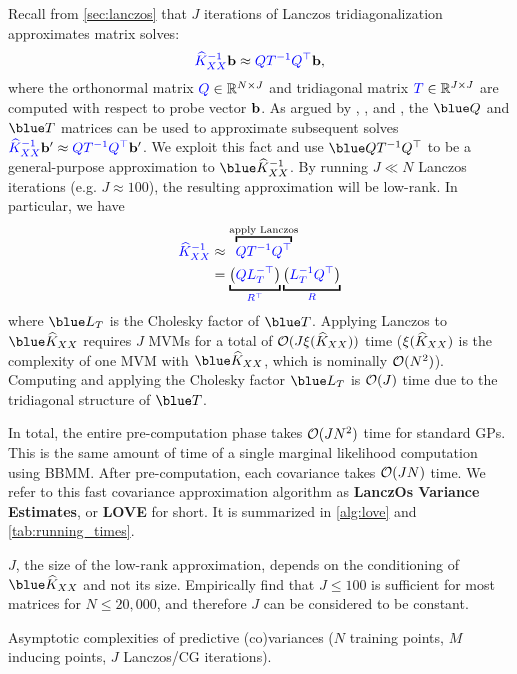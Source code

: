 Recall from \cref{sec:lanczos} that $J$ iterations of Lanczos tridiagonalization approximates matrix solves:
\[
  {\color{blue} \widehat{K}_{XX}^{-1}} \mathbf{b} \approx {\color{blue} \ensuremath{Q}\ensuremath{T}^{-1} \ensuremath{Q}^{\top}} \mathbf{b},
\]
where the orthonormal matrix ${\color{blue} Q} \in \mathbb{R}^{N \times J}$ and tridiagonal matrix ${\color{blue} T} \in \mathbb{R}^{J \times J}$ are computed with respect to probe vector $\mathbf{b}$.
As argued by \citet{parlett1980new}, \citet{saad1987lanczos}, and \citet{schneider2001krylov}, the $\blue \bQ$ and $\blue \bT$ matrices can be used to approximate subsequent solves
${\color{blue} \widehat{K}_{XX}^{-1}} \mathbf{b}' \approx {\color{blue} \ensuremath{Q}\ensuremath{T}^{-1} \ensuremath{Q}^\top} \mathbf{b}'$.
We exploit this fact and use $\blue \bQ \bT^{-1} \bQ^\top$ to be a general-purpose approximation to $\blue \trainK^{-1}$.
By running $J \ll N$ Lanczos iterations (e.g. $J \approx 100$), the resulting approximation will be low-rank.
In particular, we have
\begin{align*}
  {\color{blue} \trainK^{-1}} &\approx \overbracket{\color{blue} \bQ \bT^{-1} \bQ^\top}^{\text{apply Lanczos}}
  \\
  &=
  \underbracket{ \left( {\color{blue} \bQ \bL_\bT^{-\top}} \right)}_{\color{blue} \bR^\top}
  \underbracket{ \left( {\color{blue} \bL_\bT^{-1} \bQ^\top} \right)}_{\color{blue} \bR}
\end{align*}
%
where $\blue \bL_\bT$ is the Cholesky factor of $\blue \bT$.
Applying Lanczos to $\blue \trainK$ requires $J$ MVMs for a total of $\bigo{J \mvm{\trainK}}$ time ($\xi ( \widehat{K}_{XX} )$ is the complexity of one MVM with $\blue \trainK$, which is nominally $\bigo{N^2}$).
Computing and applying the Cholesky factor $\blue \bL_\bT$ is $\bigo{J}$ time due to the tridiagonal structure of $\blue \bT$.

In total, the entire pre-computation phase takes $\bigo{J N^2}$ time for standard GPs.
This is the same amount of time of a single marginal likelihood computation using BBMM.
After pre-computation, each covariance takes $\bigo{JN}$ time.
We refer to this fast covariance approximation algorithm as {\bf LanczOs Variance Estimates}, or {\bf LOVE} for short.
It is summarized in \cref{alg:love} and \cref{tab:running_times}.

$J$, the size of the low-rank approximation, depends on the conditioning of $\blue \trainK$ and not its size.
Empirically find that $J\leq100$ is sufficient for most matrices for $N \leq 20,\!000$, and therefore $J$ can be considered to be constant.



\begin{table*}[t!]
  \caption[Asymptotic complexities of predictive (co)variances with LOVE versus other methods.]{
    Asymptotic complexities of predictive (co)variances ($N$ training points, $M$ inducing points, $J$ Lanczos/CG iterations).
    \label{tab:running_times}
  }
  \vspace{0.5ex}
  \centering
  \resizebox{\textwidth}{!}{%
    
  }
  \vspace{-2ex}
\end{table*}

